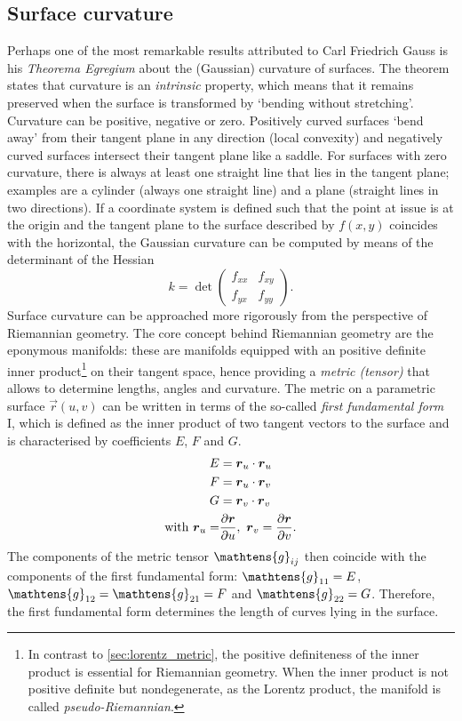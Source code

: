 \subsection{Surface curvature}
\label{ssec:curvature}
Perhaps one of the most remarkable results attributed to Carl Friedrich Gauss is his \emph{Theorema Egregium} about the (Gaussian) curvature of surfaces. The theorem states that curvature is an \emph{intrinsic} property, which means that it remains preserved when the surface is transformed by `bending without stretching'. Curvature can be positive, negative or zero. Positively curved surfaces `bend away' from their tangent plane in any direction (local convexity) and negatively curved surfaces intersect their tangent plane like a saddle. For surfaces with zero curvature, there is always at least one straight line that lies in the tangent plane; examples are a cylinder (always one straight line) and a plane (straight lines in two directions). If a coordinate system is defined such that the point at issue is at the origin and the tangent plane to the surface described by \(f(x, y)\) coincides with the horizontal, the Gaussian curvature can be computed by means of the determinant of the Hessian \cite{Thurston1997, ONeill2006}
    \[ 
        k = \det \begin{pmatrix}
                f_{xx} & f_{xy}\\
                f_{yx} & f_{yy}
        \end{pmatrix}.
    \]
Surface curvature can be approached more rigorously from the perspective of Riemannian geometry. The core concept behind Riemannian geometry are the eponymous manifolds: these are manifolds equipped with an positive definite inner product\footnote{In contrast to \cref{sec:lorentz_metric}, the positive definiteness of the inner product is essential for Riemannian geometry. When the inner product is not positive definite but nondegenerate, as the Lorentz product, the manifold is called \emph{pseudo-Riemannian}.} on their tangent space, hence providing a \emph{metric (tensor)} that allows to determine lengths, angles and curvature. The metric on a parametric surface \(\vec{r}(u, v)\) can be written in terms of the so-called \emph{first fundamental form} I, which is defined as the inner product of two tangent vectors to the surface  and is characterised by coefficients \(E\), \(F\) and \(G\).
\begin{equation}
    \begin{split}
        E &= \vb*{r}_u \cdot \vb*{r}_u \\
        F &= \vb*{r}_u \cdot \vb*{r}_v \\
        G &= \vb*{r}_v \cdot \vb*{r}_v \\
        \text{with }  \vb*{r}_u = & \pdv{\vb*{r}}{u},\ \vb*{r}_v = \pdv{\vb*{r}}{v}.
    \end{split}
    \label{eq:first_fform}
\end{equation}
The components of the metric tensor \(\mathtens{g}_{ij}\) then coincide with the components of the first fundamental form: \(\mathtens{g}_{11} = E\), \(\mathtens{g}_{12} = \mathtens{g}_{21}= F\) and \(\mathtens{g}_{22} = G\). Therefore, the first fundamental form determines the length of curves lying in the surface.

